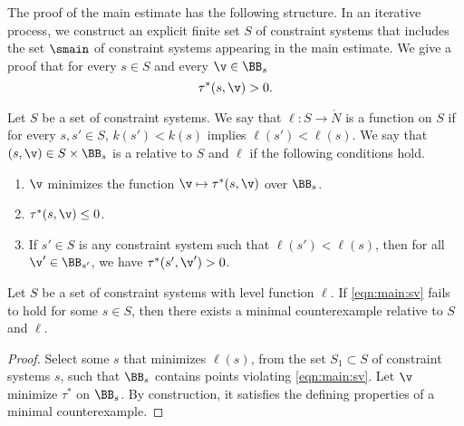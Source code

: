 The proof of the main estimate has the following structure.  In an
iterative process, we construct an explicit finite set $S$ of
constraint systems that includes the set $\smain$ of constraint
systems appearing in the main estimate.   We give a proof that for
every $s\in S$ and every $\v\in \BB_s$
\begin{equation}\label{eqn:main:sv}
\tau^*(s,\v)> 0.
\end{equation}

%
\begin{definition}
  Let $S$ be a set of constraint systems.  We say that $\ell:S\to\ring{N}$ 
  is a  function
on $S$ if for every $s,s'\in S$, $k(s')<k(s)$ implies  $\ell(s')<\ell(s)$. 
 We say that
  $(s,\v)\in S\times\BB_s$ is a   relative to $S$ and $\ell$ if
the following conditions hold.
\begin{enumerate}
\item $\v$ minimizes the function $\v\mapsto\tau^*(s,\v)$ over $\BB_s$.
\item  $\tau^*(s,\v)\le 0$.
\item If $s'\in S$ is any constraint system such that $\ell(s')<\ell(s)$, then
for all $\v'\in \BB_{s'}$, we have $\tau^*(s',\v')>0$.
\end{enumerate}
\end{definition}

\begin{lemma}\label{lemma:esm}
Let $S$ be a set of constraint systems with level function $\ell$.
If \eqref{eqn:main:sv} fails to hold for some $s\in S$, 
then there exists a minimal counterexample relative to $S$ and $\ell$.
\end{lemma}

\begin{proof}
  Select some $s$ that minimizes $\ell(s)$, from the set $S_1\subset S$ of
  constraint systems $s$, such that $\BB_s$ contains points violating
  \eqref{eqn:main:sv}.  Let $\v$ minimize $\tau^*$ on $\BB_s$.  By
  construction, it satisfies the  defining properties of a
  minimal counterexample.  
\end{proof}

